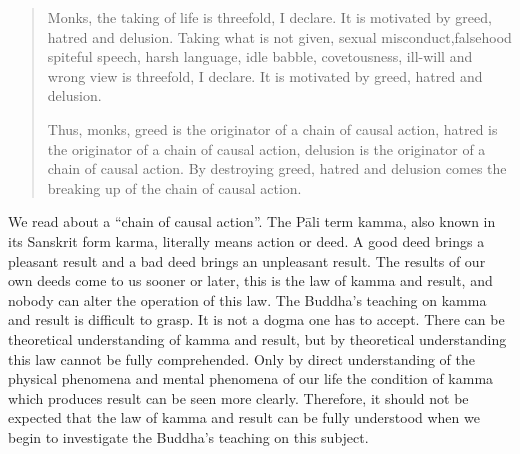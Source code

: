 \documentclass{book}
\begin{document}
\begin{quote}
Monks, the taking of life is threefold, I declare. It is motivated by
greed, hatred and delusion. Taking what is not given, sexual
misconduct,falsehood spiteful speech, harsh language, idle babble,
covetousness, ill-will and wrong view is threefold, I declare. It is
motivated by greed, hatred and delusion.

Thus, monks, greed is the originator of a chain of causal action, hatred
is the originator of a chain of causal action, delusion is the
originator of a chain of causal action. By destroying greed, hatred and
delusion comes the breaking up of the chain of causal action.
\end{quote}

We read about a ``chain of causal action''. The Pāli term kamma, also
known in its Sanskrit form karma, literally means action or deed. A good
deed brings a pleasant result and a bad deed brings an unpleasant
result. The results of our own deeds come to us sooner or later, this is
the law of kamma and result, and nobody can alter the operation of this
law. The Buddha's teaching on kamma and result is difficult to grasp. It
is not a dogma one has to accept. There can be theoretical understanding
of kamma and result, but by theoretical understanding this law cannot be
fully comprehended. Only by direct understanding of the physical
phenomena and mental phenomena of our life the condition of kamma which
produces result can be seen more clearly. Therefore, it should not be
expected that the law of kamma and result can be fully understood when
we begin to investigate the Buddha's teaching on this subject.
\end{document}
